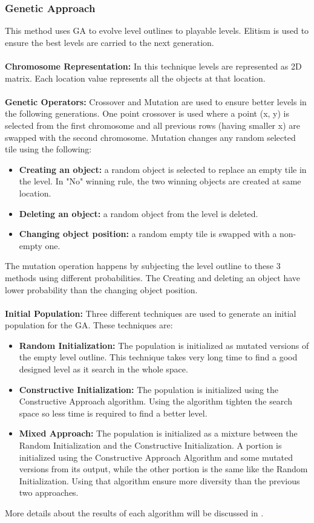 \subsubsection{Genetic Approach}
This method uses GA to evolve level outlines to playable levels. Elitism is used to ensure the best levels are carried to the next generation.\\\\
\textbf{Chromosome Representation:} In this technique levels are represented as 2D matrix. Each location value represents all the objects at that location.\\\\
\textbf{Genetic Operators:} Crossover and Mutation are used to ensure better levels in the following generations. One point crossover is used where a point (x, y) is selected from the first chromosome and all previous rows (having smaller x) are swapped with the second chromosome. Mutation changes any random selected tile using the following:
\begin{itemize} \itemsep0pt \parskip0pt 
	\item \textbf{Creating an object:} a random object is selected to replace an empty tile in the level. In "No" winning rule, the two winning objects are created at same location.
	\item \textbf{Deleting an object:} a random object from the level is deleted.
	\item \textbf{Changing object position:} a random empty tile is swapped with a non-empty one.
\end{itemize}
The mutation operation happens by subjecting the level outline to these 3 methods using different probabilities. The Creating and deleting an object have lower probability than the changing object position.\\\\
\textbf{Initial Population:} Three different techniques are used to generate an initial population for the GA. These techniques are:
\begin{itemize} \itemsep0pt \parskip0pt 
	\item \textbf{Random Initialization:} The population is initialized as mutated versions of the empty level outline. This technique takes very long time to find a good designed level as it search in the whole space.
	\item \textbf{Constructive Initialization:} The population is initialized using the Constructive Approach algorithm. Using the algorithm tighten the search space so less time is required to find a better level.
	\item \textbf{Mixed Approach:} The population is initialized as a mixture between the Random Initialization and the Constructive Initialization. A portion is initialized using the Constructive Approach Algorithm and some mutated versions from its output, while the other portion is the same like the Random Initialization. Using that algorithm ensure more diversity than the previous two approaches.
\end{itemize}
More details about the results of each algorithm will be discussed in .
